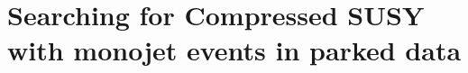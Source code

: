 \chapter{Searching for Compressed SUSY with monojet events in parked data}
\label{chap:parkeddata}

